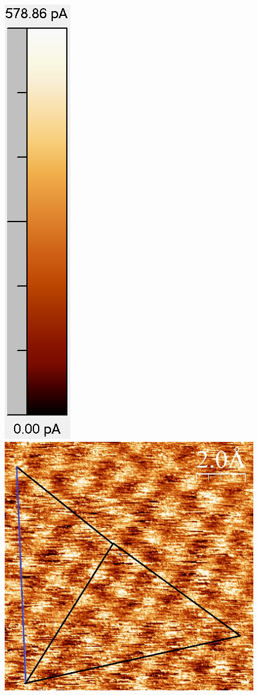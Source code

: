 \documentclass[12pt,a4paper]{article}
\begin{document}
\begin{figure}[H]
\includegraphics[scale=0.49]{Bilder/Atome/hoch1_scale.png}
\includegraphics[scale=0.36]{Bilder/Atome/hoch1_v.jpg}

\end{figure}
\end{document}
